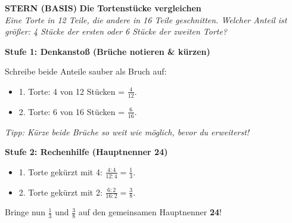 \documentclass[a4paper,10pt]{article}
\newcommand{\mFrac}[2]{\frac{#1}{#2}}
\begin{document}
\begin{tcolorbox}[
    enhanced, colback=white, colframe=primaryBlue, arc=3mm, boxrule=1.2pt,
    left=4.5mm, right=4.5mm, top=2.5mm, bottom=2.5mm, height=12.9cm
]
    \begin{center}
        {\color{lvlGreen}\textbf{\faStar{} STERN (BASIS)}}\quad
        {\color{primaryBlue}\large\bfseries {}\quad Die Tortenstücke vergleichen}\\[1mm]
        {\footnotesize\textit{Eine Torte in 12 Teile, die andere in 16 Teile geschnitten. Welcher Anteil ist größer: 4 Stücke der ersten oder 6 Stücke der zweiten Torte?}}
    \end{center}
    \vspace{0.5mm}

    \begin{tcolorbox}[colback=step1Bg, colframe=step1Border, arc=2mm, boxrule=0.7pt, left=3mm, right=3mm, top=1.8mm, bottom=1.8mm]
        {\color{step1Text}\bfseries\faLightbulb\enskip Stufe 1: Denkanstoß (Brüche notieren \& kürzen)}\\[0.8mm]
        {\small
        Schreibe beide Anteile sauber als Bruch auf:
        \begin{itemize}[leftmargin=4mm, itemsep=0.2pt, topsep=1pt]
            \item 1. Torte: 4 von 12 Stücken = $\mFrac{4}{12}$.
            \item 2. Torte: 6 von 16 Stücken = $\mFrac{6}{16}$.
        \end{itemize}
        {\color{step1Text}\faHandPointRight}\enskip \textit{Tipp: Kürze beide Brüche so weit wie möglich, bevor du erweiterst!}
        }
    \end{tcolorbox}
    \vspace{0.8mm}

    \begin{tcolorbox}[colback=step2Bg, colframe=step2Border, arc=2mm, boxrule=0.7pt, left=3mm, right=3mm, top=1.8mm, bottom=1.8mm]
        {\color{step2Text}\bfseries\faSearch\enskip Stufe 2: Rechenhilfe (Hauptnenner 24)}\\[0.8mm]
        {\small
        \begin{itemize}[leftmargin=4mm, itemsep=0.2pt, topsep=1pt]
            \item 1. Torte gekürzt mit 4: $\mFrac{4 : 4}{12 : 4} = \mFrac{1}{3}$.
            \item 2. Torte gekürzt mit 2: $\mFrac{6 : 2}{16 : 2} = \mFrac{3}{8}$.
        \end{itemize}
        Bringe nun $\mFrac{1}{3}$ und $\mFrac{3}{8}$ auf den gemeinsamen Hauptnenner \textbf{24}!
        }
    \end{tcolorbox}
    \vspace{0.8mm}


\end{tcolorbox}
\end{document}
